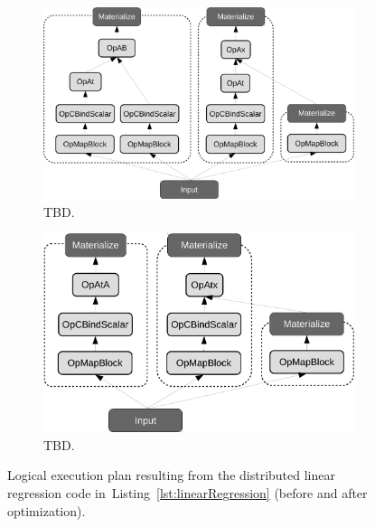 \documentclass{article}
\begin{document}
\begin{figure}
    \centering
         \begin{subfigure}[b]{0.5\textwidth}
            \centering
            \includegraphics[scale=.33]{figures/linear-regression-logicalplan-crop}
            \caption{TBD.}
            \label{fig:logicalplan}
        \end{subfigure}
  \hfill
         \begin{subfigure}[b]{0.4\textwidth}
            \centering
            \includegraphics[scale=.33]{figures/linear-regression-logicalplan-optimized-crop}
            \caption{TBD.}
            \label{fig:logicalplan-optimized}
        \end{subfigure}
        \caption{\label{fig:logicalplans} Logical execution plan resulting from the distributed linear regression code in~Listing~\ref{lst:linearRegression} (before and after optimization).}
\end{figure}
\end{document}
